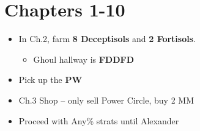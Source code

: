 \chapter{Chapters 1-10}

\begin{itemize}
	\item In Ch.2, farm \textbf{8 Deceptisols} and \textbf{2 Fortisols}.
		\begin{itemize}
			\item Ghoul hallway is \textbf{FDDFD}
		\end{itemize}
	\item Pick up the \textbf{PW}
	\item Ch.3 Shop -- only sell Power Circle, buy 2 MM
	\item Proceed with Any\% strats until Alexander
\end{itemize}